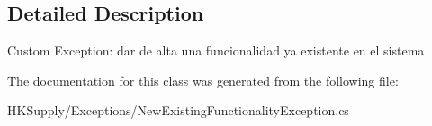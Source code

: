 \subsection{Detailed Description}
Custom Exception\+: dar de alta una funcionalidad ya existente en el sistema 



The documentation for this class was generated from the following file\+:\begin{DoxyCompactItemize}
\item 
H\+K\+Supply/\+Exceptions/New\+Existing\+Functionality\+Exception.\+cs\end{DoxyCompactItemize}
